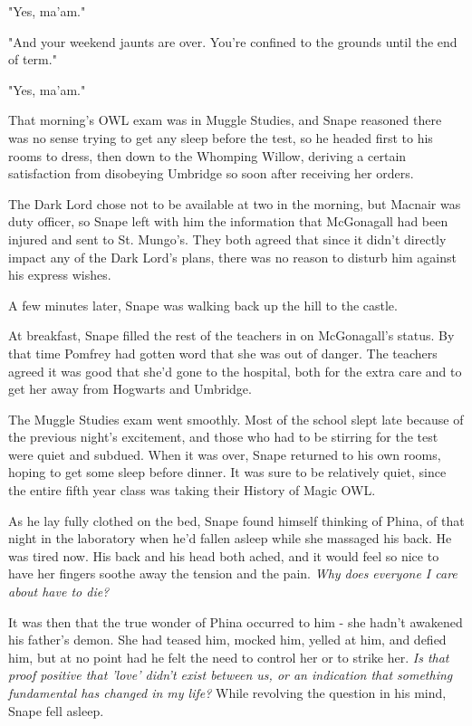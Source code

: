 \documentclass[a4paper,11pt]{article}
\begin{document}
"Yes, ma'am."

"And your weekend jaunts are over. You're confined to the grounds until the end of term."

"Yes, ma'am."

That morning's OWL exam was in Muggle Studies, and Snape reasoned there was no sense trying to get any sleep before the test, so he headed first to his rooms to dress, then down to the Whomping Willow, deriving a certain satisfaction from disobeying Umbridge so soon after receiving her orders.

The Dark Lord chose not to be available at two in the morning, but Macnair was duty officer, so Snape left with him the information that McGonagall had been injured and sent to St. Mungo's. They both agreed that since it didn't directly impact any of the Dark Lord's plans, there was no reason to disturb him against his express wishes.

A few minutes later, Snape was walking back up the hill to the castle.

At breakfast, Snape filled the rest of the teachers in on McGonagall's status. By that time Pomfrey had gotten word that she was out of danger. The teachers agreed it was good that she'd gone to the hospital, both for the extra care and to get her away from Hogwarts and Umbridge.

The Muggle Studies exam went smoothly. Most of the school slept late because of the previous night's excitement, and those who had to be stirring for the test were quiet and subdued. When it was over, Snape returned to his own rooms, hoping to get some sleep before dinner. It was sure to be relatively quiet, since the entire fifth year class was taking their History of Magic OWL.

As he lay fully clothed on the bed, Snape found himself thinking of Phina, of that night in the laboratory when he'd fallen asleep while she massaged his back. He was tired now. His back and his head both ached, and it would feel so nice to have her fingers soothe away the tension and the pain. \emph{Why does everyone I care about have to die?}

It was then that the true wonder of Phina occurred to him - she hadn't awakened his father's demon. She had teased him, mocked him, yelled at him, and defied him, but at no point had he felt the need to control her or to strike her. \emph{Is that proof positive that 'love' didn't exist between us, or an indication that something fundamental has changed in my life?} While revolving the question in his mind, Snape fell asleep.
\end{document}
